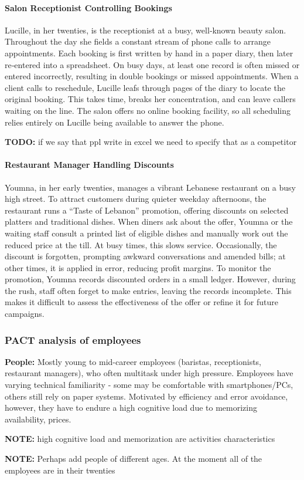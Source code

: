 \documentclass[]{VUMIFTemplateClass}
\newcommand{\noticecomment}[1]{%
    \begin{tcolorbox}[colback=blue!20, colframe=blue!60, arc=0pt, outer arc=0pt, boxrule=1pt, left=3pt, right=3pt, top=3pt, bottom=3pt]
        \textbf{\textcolor{blue!70!black}{NOTE:}} #1
    \end{tcolorbox}
}
\newcommand{\todocomment}[1]{%
    \begin{tcolorbox}[colback=red!20, colframe=red!60, arc=0pt, outer arc=0pt, boxrule=1pt, left=3pt, right=3pt, top=3pt, bottom=3pt]
        \textbf{\textcolor{orange!70!black}{TODO:}} #1
    \end{tcolorbox}
}
\newcommand{\subsubsubsection}[1]{\paragraph{#1}}
\begin{document}


\subsubsubsection{Salon Receptionist Controlling Bookings}

Lucille, in her twenties, is the receptionist at a busy, well‑known beauty
salon. Throughout the day she fields a constant stream of phone calls to arrange
appointments. Each booking is first written by hand in a paper diary, then later
re‑entered into a spreadsheet. On busy days, at least one record is often missed
or entered incorrectly, resulting in double bookings or missed appointments.
When a client calls to reschedule, Lucille leafs through pages of the diary to
locate the original booking. This takes time, breaks her concentration, and can
leave callers waiting on the line. The salon offers no online booking facility,
so all scheduling relies entirely on Lucille being available to answer the
phone.

\todocomment{if we say that ppl write in excel we need to specify that as a competitor}


\subsubsubsection{Restaurant Manager Handling Discounts}


Youmna, in her early twenties, manages a vibrant Lebanese restaurant on a busy
high street. To attract customers during quieter weekday afternoons, the
restaurant runs a “Taste of Lebanon” promotion, offering discounts on selected
platters and traditional dishes. When diners ask about the offer, Youmna or the
waiting staff consult a printed list of eligible dishes and manually work out
the reduced price at the till. At busy times, this slows service. Occasionally,
the discount is forgotten, prompting awkward conversations and amended bills; at
other times, it is applied in error, reducing profit margins. To monitor the
promotion, Youmna records discounted orders in a small ledger. However, during
the rush, staff often forget to make entries, leaving the records incomplete.
This makes it difficult to assess the effectiveness of the offer or refine it
for future campaigns.

\subsubsection{PACT analysis of employees}
    \textbf{People:} Mostly young to mid-career employees (baristas,
    receptionists, restaurant managers), who often multitask under high
    pressure. Employees have varying technical familiarity - some may be
    comfortable with smartphones/PCs, others still rely on paper systems.
    Motivated by efficiency and error avoidance, however, they have to endure a
    high cognitive load due to memorizing availability, prices.
    \noticecomment{high cognitive load and memorization are activities characteristics}
    \noticecomment{Perhaps add people of different ages. At the moment all of the employees are in their twenties}
    
\end{document}
